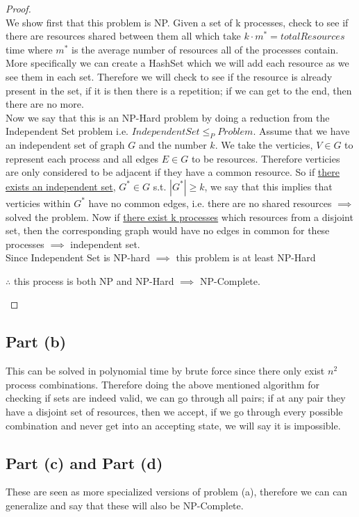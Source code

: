 \documentclass[12pt]{article}
\begin{document}
\begin{proof}
~ \\ \indent We show first that this problem is NP. Given a set of k processes, check
to see if there are resources shared between them all which take $k\cdot m^{\ast} = totalResources$
time where $m^{\ast}$ is the average number of resources all of the processes contain.
More specifically we can create a HashSet which we will add each resource as we see them
in each set. Therefore we will check to see if the resource is already present in the
set, if it is then there is a repetition; if we can get to the end, then there are no more. \\
\indent Now we say that this is an NP-Hard problem by doing a reduction from the Independent
Set problem i.e. $IndependentSet \leq_P Problem$. Assume that we have an independent set of
graph $G$ and the number $k$. We take the verticies, $V \in G$ to represent each process and
all edges $E \in G$ to be resources. Therefore verticies are only considered to be adjacent if
they have a common resource. So if \underline{there exists an independent set}, $G^{\ast}\in G$
s.t. $|G^{\ast}| \geq k$, we say that this implies that verticies within $G^{\ast}$ have no
common edges, i.e. there are no shared resources $\implies$ solved the problem. Now if
\underline{there exist k processes} which resources from a disjoint set, then the corresponding
graph would have no edges in common for these processes $\implies$ independent set. \\
\indent Since Independent Set is NP-hard $\implies$ this problem is at least NP-Hard
\begin{center}$\therefore$ this process is both NP and NP-Hard $\implies$ NP-Complete.\end{center}
\end{proof}

\subsection{Part (b)}
This can be solved in polynomial time by brute force since there only exist $n^2$ process
combinations. Therefore doing the above mentioned algorithm for checking if sets are indeed
valid, we can go through all pairs; if at any pair they have a disjoint set of resources, then
we accept, if we go through every possible combination and never get into an accepting state,
we will say it is impossible.

\subsection{Part (c) and Part (d)}
These are seen as more specialized versions of problem (a), therefore we can can generalize
and say that these will also be NP-Complete.

\end{document}
